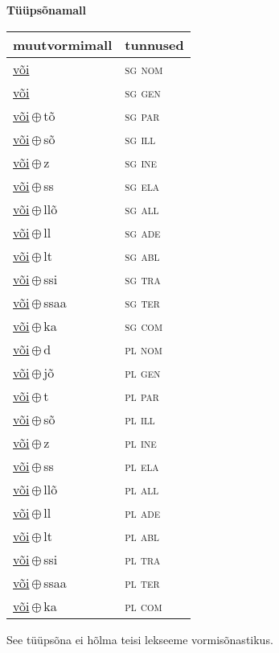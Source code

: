 

\vspace{3.5em}
\noindent \begin{minipage}{\textwidth}
\noindent \textbf{Tüüpsõnamall \,}\\

\begin{sideways}
\begin{tabular}{l l}
muutvormimall & tunnused \\
\hline
\underline{või} & \textsc{ sg nom } \\
\underline{või} & \textsc{ sg gen } \\
\underline{või}\,$\oplus$\,tõ & \textsc{ sg par } \\
\underline{või}\,$\oplus$\,sõ & \textsc{ sg ill } \\
\underline{või}\,$\oplus$\,z & \textsc{ sg ine } \\
\underline{või}\,$\oplus$\,ss & \textsc{ sg ela } \\
\underline{või}\,$\oplus$\,llõ & \textsc{ sg all } \\
\underline{või}\,$\oplus$\,ll & \textsc{ sg ade } \\
\underline{või}\,$\oplus$\,lt & \textsc{ sg abl } \\
\underline{või}\,$\oplus$\,ssi & \textsc{ sg tra } \\
\underline{või}\,$\oplus$\,ssaa & \textsc{ sg ter } \\
\underline{või}\,$\oplus$\,ka & \textsc{ sg com } \\
\underline{või}\,$\oplus$\,d & \textsc{ pl nom } \\
\underline{või}\,$\oplus$\,jõ & \textsc{ pl gen } \\
\underline{või}\,$\oplus$\,t & \textsc{ pl par } \\
\underline{või}\,$\oplus$\,sõ & \textsc{ pl ill } \\
\underline{või}\,$\oplus$\,z & \textsc{ pl ine } \\
\underline{või}\,$\oplus$\,ss & \textsc{ pl ela } \\
\underline{või}\,$\oplus$\,llõ & \textsc{ pl all } \\
\underline{või}\,$\oplus$\,ll & \textsc{ pl ade } \\
\underline{või}\,$\oplus$\,lt & \textsc{ pl abl } \\
\underline{või}\,$\oplus$\,ssi & \textsc{ pl tra } \\
\underline{või}\,$\oplus$\,ssaa & \textsc{ pl ter } \\
\underline{või}\,$\oplus$\,ka & \textsc{ pl com } \\
\end{tabular}
\end{sideways}
\label{tab:tüüpsõnamall-või}

\end{minipage}

 
\vspace{1em}
\noindent See tüüpsõna ei hõlma teisi lekseeme vormi\-sõnastikus.

